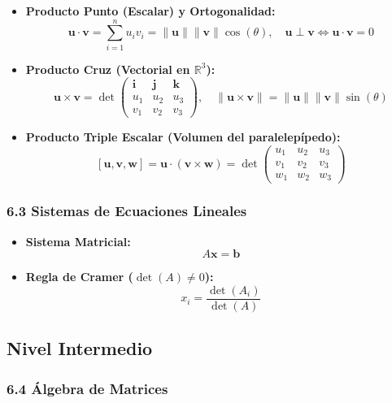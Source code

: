 \documentclass[11pt,a4paper]{article}
\begin{document}
\begin{itemize}
  \item \textbf{Producto Punto (Escalar) y Ortogonalidad:}
  \[
    \mathbf{u} \cdot \mathbf{v} = \sum_{i=1}^n u_i v_i = \|\mathbf{u}\| \|\mathbf{v}\| \cos(\theta), \quad \mathbf{u} \perp \mathbf{v} \iff \mathbf{u} \cdot \mathbf{v} = 0
  \]
  \item \textbf{Producto Cruz (Vectorial en $\mathbb{R}^3$):}
  \[
    \mathbf{u} \times \mathbf{v} = \det\begin{pmatrix} \mathbf{i} & \mathbf{j} & \mathbf{k} \\ u_1 & u_2 & u_3 \\ v_1 & v_2 & v_3 \end{pmatrix}, \quad \|\mathbf{u} \times \mathbf{v}\| = \|\mathbf{u}\| \|\mathbf{v}\| \sin(\theta)
  \]
  \item \textbf{Producto Triple Escalar (Volumen del paralelepípedo):}
  \[
    [\mathbf{u}, \mathbf{v}, \mathbf{w}] = \mathbf{u} \cdot (\mathbf{v} \times \mathbf{w}) = \det\begin{pmatrix} u_1 & u_2 & u_3 \\ v_1 & v_2 & v_3 \\ w_1 & w_2 & w_3 \end{pmatrix}
  \]
\end{itemize}

\subsubsection*{6.3 Sistemas de Ecuaciones Lineales}

\begin{itemize}
  \item \textbf{Sistema Matricial:}
  \[
    A\mathbf{x} = \mathbf{b}
  \]
  \item \textbf{Regla de Cramer ($\det(A) \ne 0$):}
  \[
    x_i = \frac{\det(A_i)}{\det(A)}
  \]
\end{itemize}

\subsection*{Nivel Intermedio}

\subsubsection*{6.4 Álgebra de Matrices}
\end{document}
